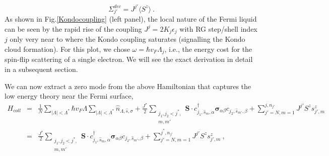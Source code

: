 \documentclass[aps,prb,preprint,groupedaddress]{revtex4-2}
\begin{document}
\begin{equation}
\Sigma^{dec}_{j'} = J^{j'}\langle S^{z}\rangle~.  
\end{equation}
As shown in Fig.\ref{Kondocoupling} (left panel), the local nature of the Fermi liquid can be seen by the rapid rise of the coupling $J^{j}=2K_{j}\epsilon_{j}$ with RG step/shell index $j$ only very near to where the Kondo coupling saturates (signalling the Kondo cloud formation). For this plot, we chose $\omega=\hbar v_{F}\Lambda_{j}$, i.e., the energy cost for the spin-flip scattering of a single electron. We will see the exact derivation in detail in a subsequent section.
\par\noindent
We can now extract a zero mode from the above Hamiltonian that captures the low energy theory near the Fermi surface,
\begin{eqnarray}
H_{coll}&=&\frac{1}{N}\sum_{|\Lambda|<\Lambda^{*}}\hbar v_{F}\Lambda\sum_{|\Lambda|<\Lambda^{*}}\hat{n}_{\Lambda,\hat{s},\sigma}+\frac{J^{*}}{2}\sum_{\substack{j_{1},j_{2}<j^{*},\\ m,m'}}\mathbf{S}\cdot c^{\dagger}_{j_{1},\hat{s}_{m},\alpha}\boldsymbol{\sigma}_{\alpha\beta}c_{j_{2},\hat{s}_{m'},\beta}+\sum_{j'=N,m=1}^{j,n_{j'}}J^{j'}S^{z}s^{z}_{j',m}\nonumber\\
		&=&\frac{J^{*}}{2}\sum_{\substack{j_{1},j_{2}<j^{*},\\ m,m'}}\mathbf{S}\cdot c^{\dagger}_{j_{1},\hat{s}_{m},\alpha}\boldsymbol{\sigma}_{\alpha\beta}c_{j_{2},\hat{s}_{m'},\beta}+\sum_{j'=N,m=1}^{j^{*},n_{j'}}J^{j'}S^{z}s^{z}_{j',m}~,
\end{eqnarray}
\end{document}
